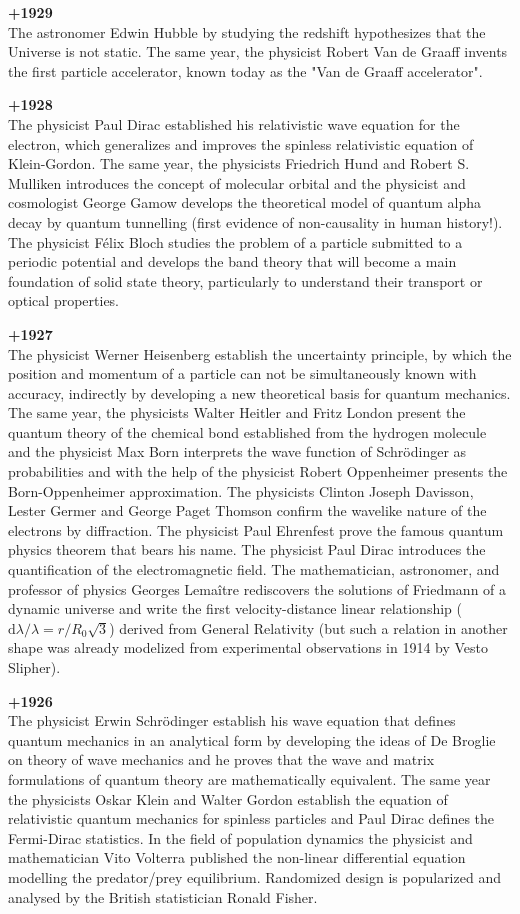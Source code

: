 \textbf{+1929}\\
The astronomer Edwin Hubble by studying the redshift hypothesizes that the Universe is not static. The same year, the physicist Robert Van de Graaff invents the first particle accelerator, known today as the "Van de Graaff accelerator".

\textbf{+1928}\\
The physicist Paul Dirac established his relativistic wave equation for the electron, which generalizes and improves the spinless relativistic equation of Klein-Gordon. The same year, the physicists Friedrich Hund and Robert S. Mulliken introduces the concept of molecular orbital and the physicist and cosmologist George Gamow develops the theoretical model of quantum alpha decay by quantum tunnelling (first evidence of non-causality in human history!). The physicist Félix Bloch studies the problem of a particle submitted to a periodic potential and develops the band theory that will become a main foundation of solid state theory, particularly to understand their transport or optical properties.

\textbf{+1927}\\
The physicist Werner Heisenberg establish the uncertainty principle, by which the position and momentum of a particle can not be simultaneously known with accuracy, indirectly by developing a new theoretical basis for quantum mechanics. The same year, the physicists Walter Heitler and Fritz London present the quantum theory of the chemical bond established from the hydrogen molecule and the physicist Max Born interprets the wave function of Schrödinger as probabilities and with the help of the physicist Robert Oppenheimer presents the Born-Oppenheimer approximation. The physicists Clinton Joseph Davisson, Lester Germer and George Paget Thomson confirm the wavelike nature of the electrons by diffraction. The physicist Paul Ehrenfest prove the famous quantum physics theorem that bears his name. The physicist Paul Dirac introduces the quantification of the electromagnetic field. The mathematician, astronomer, and professor of physics Georges Lemaître rediscovers the solutions of Friedmann of a dynamic universe and write the first velocity-distance linear relationship ($\mathrm{d}\lambda/\lambda =r/R_0\sqrt{3}$) derived from General Relativity (but such a relation in another shape was already modelized from experimental observations in 1914 by Vesto Slipher).

\textbf{+1926}\\
The physicist Erwin Schrödinger establish his wave equation that defines quantum mechanics in an analytical form by developing the ideas of De Broglie on theory of wave mechanics and he proves that the wave and matrix formulations of quantum theory are mathematically equivalent. The same year the physicists Oskar Klein and Walter Gordon establish the equation of relativistic quantum mechanics for spinless particles and Paul Dirac defines the Fermi-Dirac statistics. In the field of population dynamics the physicist and mathematician Vito Volterra published the non-linear differential equation modelling the predator/prey equilibrium. Randomized design is popularized and analysed by the British statistician Ronald Fisher.


